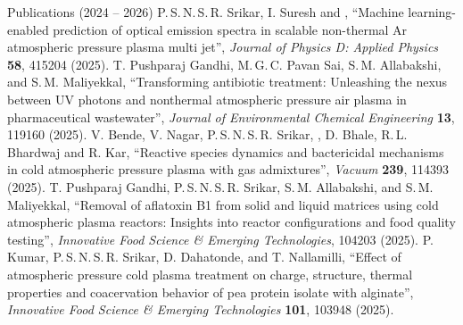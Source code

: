 \begin{rubric}{Publications (2024 -- 2026)}
\entry*[] \small P.\,S.\,N.\,S.\,R. Srikar, I. Suresh and ,
  ``Machine learning-enabled prediction of optical emission spectra in scalable non-thermal Ar atmospheric pressure plasma multi jet'',
  \emph{Journal of Physics D: Applied Physics} \textbf{58}, 415204 (2025). 
\entry*[] \small T. Pushparaj Gandhi, M.\,G.\,C. Pavan Sai, S.\,M. Allabakshi,  and S.\,M. Maliyekkal,
  ``Transforming antibiotic treatment: Unleashing the nexus between UV photons and nonthermal atmospheric pressure air plasma in pharmaceutical wastewater'',
  \emph{Journal of Environmental Chemical Engineering} \textbf{13}, 119160 (2025). 
\entry*[] \small V. Bende, V. Nagar, P.\,S.\,N.\,S.\,R. Srikar, , D. Bhale, R.\,L. Bhardwaj and R. Kar,
  ``Reactive species dynamics and bactericidal mechanisms in cold atmospheric pressure plasma with gas admixtures'',
  \emph{Vacuum} \textbf{239}, 114393 (2025). 
\entry*[] \small T. Pushparaj Gandhi, P.\,S.\,N.\,S.\,R. Srikar, S.\,M. Allabakshi,  and S.\,M. Maliyekkal,
  ``Removal of aflatoxin B1 from solid and liquid matrices using cold atmospheric plasma reactors: Insights into reactor configurations and food quality testing'',
  \emph{Innovative Food Science \& Emerging Technologies}, 104203 (2025). 
\entry*[] \small P. Kumar, P.\,S.\,N.\,S.\,R. Srikar, D. Dahatonde,  and T. Nallamilli,
  ``Effect of atmospheric pressure cold plasma treatment on charge, structure, thermal properties and coacervation behavior of pea protein isolate with alginate'',
  \emph{Innovative Food Science \& Emerging Technologies} \textbf{101}, 103948 (2025). 


\end{rubric}
